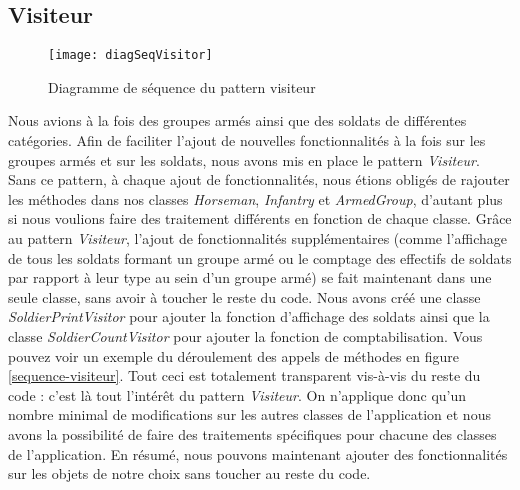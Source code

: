 \subsection{Visiteur}
\begin{figure}[h]
\begin{center}
    \texttt{[image: diagSeqVisitor]}
\end{center}
    \caption{Diagramme de séquence du pattern visiteur}
    \label{sequence-visiteur}
\end{figure}

Nous avions à la fois des groupes armés ainsi que des soldats de différentes catégories. Afin de faciliter l'ajout de nouvelles fonctionnalités à la fois sur les groupes armés et sur les soldats, nous avons mis en place le pattern \emph{Visiteur}. Sans ce pattern, à chaque ajout de fonctionnalités, nous étions obligés de rajouter les méthodes dans nos classes \emph{Horseman}, \emph{Infantry} et \emph{ArmedGroup}, d'autant plus si nous voulions faire des traitement différents en fonction de chaque classe. Grâce au pattern \emph{Visiteur}, l'ajout de fonctionnalités supplémentaires (comme l'affichage de tous les soldats formant un groupe armé ou le comptage des effectifs de soldats par rapport à leur type au sein d’un groupe armé) se fait maintenant dans une seule classe, sans avoir à toucher le reste du code. Nous avons créé une classe \emph{SoldierPrintVisitor} pour ajouter la fonction d'affichage des soldats ainsi que la classe \emph{SoldierCountVisitor} pour ajouter la fonction de comptabilisation. Vous pouvez voir un exemple du déroulement des appels de méthodes en figure \vref{sequence-visiteur}. Tout ceci est totalement transparent vis-à-vis du reste du code : c'est là tout l'intérêt du pattern \emph{Visiteur}. On n'applique donc qu'un nombre minimal de modifications sur les autres classes de l'application et nous avons la possibilité de faire des traitements spécifiques pour chacune des classes de l'application. En résumé, nous pouvons maintenant ajouter des fonctionnalités sur les objets de notre choix sans toucher au reste du code.